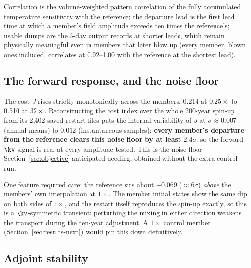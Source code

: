 \noindent
Correlation is the volume-weighted pattern correlation of the fully accumulated
temperature sensitivity with the reference; the departure lead is the first
lead time at which a member's field amplitude exceeds ten times the
reference's; usable dumps are the 5-day output records at shorter leads, which
remain physically meaningful even in members that later blow up (every member,
blown ones included, correlates at 0.92--1.00 with the reference at the
shortest lead).

\subsection{The forward response, and the noise floor}
\label{sec:results-forward}

The cost $J$ rises strictly monotonically across the members, 0.214 at
$0.25\times$ to 0.510 at $32\times$. Reconstructing the cost index over the
whole 200-year spin-up from its 2{,}402 saved restart files puts the internal
variability of $J$ at $\sigma\approx0.007$ (annual means) to $0.012$
(instantaneous samples): \textbf{every member's departure from the reference
clears this noise floor by at least $2.4\sigma$}, so the forward $\kv$ signal
is real at every amplitude tested. This is the noise floor
Section~\ref{sec:objective} anticipated needing, obtained without the extra
control run.

One feature required care: the reference sits about $+0.069$ ($\approx6\sigma$)
\emph{above} the members' own interpolation at $1\times$. The member initial
states show the same dip on both sides of $1\times$, and the restart itself
reproduces the spin-up exactly, so this is a $\kv$-symmetric transient: perturbing
the mixing in either direction weakens the transport during the ten-year
adjustment. A $1\times$ control member (Section~\ref{sec:results-next}) would
pin this down definitively.

\subsection{Adjoint stability}
\label{sec:results-stability}

